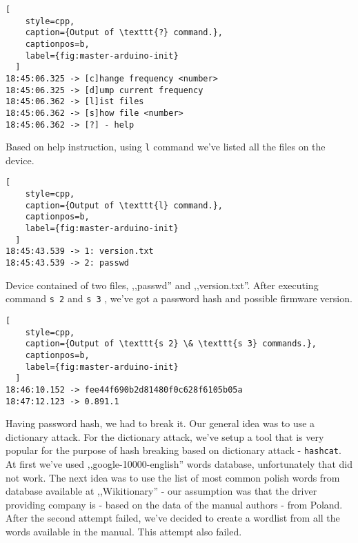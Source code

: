 \begin{minipage}{\linewidth}
  \begin{lstlisting}[
    style=cpp,
    caption={Output of \texttt{?} command.},
    captionpos=b,
    label={fig:master-arduino-init}
  ]
18:45:06.325 -> [c]hange frequency <number>
18:45:06.325 -> [d]ump current frequency
18:45:06.362 -> [l]ist files
18:45:06.362 -> [s]how file <number>
18:45:06.362 -> [?] - help
  \end{lstlisting}
  \end{minipage}

Based on help instruction, using \texttt{l} command we've listed all the files on the device.

\begin{minipage}{\linewidth}
  \begin{lstlisting}[
    style=cpp,
    caption={Output of \texttt{l} command.},
    captionpos=b,
    label={fig:master-arduino-init}
  ]
18:45:43.539 -> 1: version.txt
18:45:43.539 -> 2: passwd
  \end{lstlisting}
  \end{minipage}

Device contained of two files, ,,passwd'' and ,,version.txt''. After executing command \texttt{s 2} and \texttt{s 3} , we've got a password hash and possible firmware version.


\begin{minipage}{\linewidth}
  \begin{lstlisting}[
    style=cpp,
    caption={Output of \texttt{s 2} \& \texttt{s 3} commands.},
    captionpos=b,
    label={fig:master-arduino-init}
  ]
18:46:10.152 -> fee44f690b2d81480f0c628f6105b05a
18:47:12.123 -> 0.891.1
  \end{lstlisting}
  \end{minipage}

Having password hash, we had to break it. Our general idea was to use a dictionary attack. For the dictionary attack, we've setup a tool that is very popular for the purpose of hash breaking based on dictionary attack - \texttt{hashcat}. At first we've used ,,google-10000-english'' words database, unfortunately that did not work. The next idea was to use the list of most common polish words from database available at ,,Wikitionary'' - our assumption was that the driver providing company is - based on the data of the manual authors - from Poland. After the second attempt failed, we've decided to create a wordlist from all the words available in the manual. This attempt also failed.


